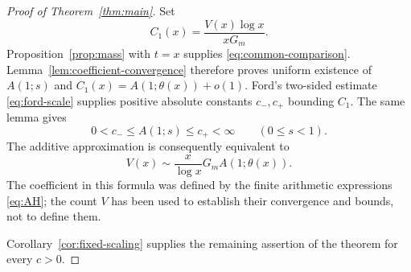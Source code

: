 \begin{proof}[Proof of Theorem~\ref{thm:main}]
Set
\[
 C_1(x)=\frac{V(x)\log x}{xG_m}.
\]
Proposition~\ref{prop:mass} with $t=x$ supplies
\eqref{eq:common-comparison}.  Lemma~\ref{lem:coefficient-convergence}
therefore proves uniform existence of $A(1;s)$ and
$C_1(x)=A(1;\theta(x))+o(1)$.  Ford's two-sided estimate
\eqref{eq:ford-scale} supplies positive absolute constants
$c_-,c_+$ bounding $C_1$.  The same lemma gives
\[
 0<c_-\le A(1;s)\le c_+<\infty\qquad(0\le s<1).
\]
The additive approximation is consequently equivalent to
\[
 V(x)\sim\frac{x}{\log x}G_mA(1;\theta(x)).
\]
The coefficient in this formula was defined by the finite arithmetic
expressions \eqref{eq:AH}; the count $V$ has been used to establish
their convergence and bounds, not to define them.

Corollary~\ref{cor:fixed-scaling} supplies the remaining assertion of
the theorem for every \(c>0\).
\end{proof}
